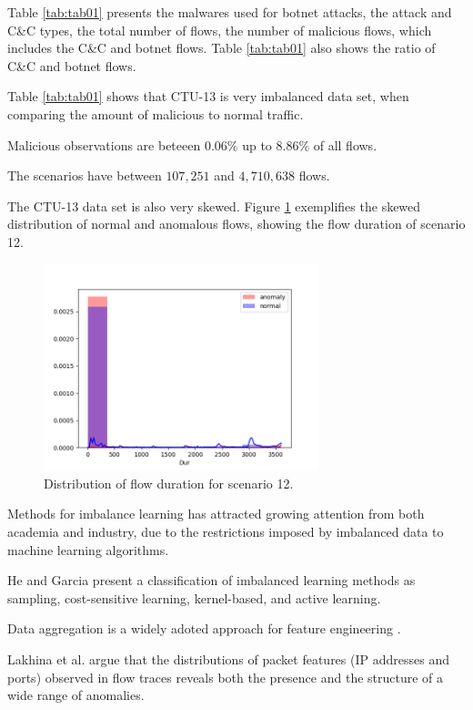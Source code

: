 \documentclass[review]{elsarticle}
\begin{document}
Table \ref{tab:tab01} presents the malwares used for botnet attacks, the attack and C\&C types, the total number of flows, the number of malicious flows, which includes the C\&C and botnet flows. Table \ref{tab:tab01} also shows the ratio of C\&C and botnet flows.

Table \ref{tab:tab01} shows that CTU-13 is very imbalanced data set, when comparing the amount of malicious to normal traffic.

Malicious observations are beteeen $0.06\%$ up to $8.86\%$ of all flows.

The scenarios have between $107,251$ and $4,710,638$ flows.

The CTU-13 data set is also very skewed. Figure \ref{fig:fig06} exemplifies the skewed distribution of normal and anomalous flows, showing the flow duration of scenario 12.

\begin{figure}[h!]
     \centering
     \includegraphics[width=8cm]{figures/raw_distplot_capture20110812_Dur.png}
     \caption{Distribution of flow duration for scenario 12.}
     \label{fig:fig06}
\end{figure}
	
Methods for imbalance learning has attracted growing attention from both academia and industry, due to the restrictions imposed by imbalanced data to machine learning algorithms.

He and Garcia \cite{he2008learning} present a classification of imbalanced learning methods as sampling, cost-sensitive learning, kernel-based, and active learning.

Data aggregation is a widely adoted approach for feature engineering \cite{chandrashekar2014survey,acarali2016survey}.

Lakhina et al. \cite{lakhina2005mining} argue that the distributions of packet features (IP addresses and ports) observed in flow traces reveals both the presence and the structure of a wide range of anomalies.
\end{document}
